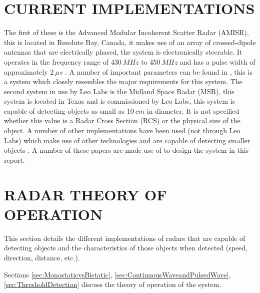\documentclass[11pt]{witseiepaper}
\begin{document}
\begin{bibunit}[witseie]

\section{CURRENT IMPLEMENTATIONS} \label{sec:CurrentImplementations}
 The first of these is the Advanced Modular Incoherent Scatter Radar (AMISR), this is located in Resolute Bay, Canada, it makes use of an array of crossed-dipole antennas that are electrically phased, the system is electronically steerable. It operates in the frequency range of $430~MHz$ to $450~MHz$ and has a pulse width of approximately $2~\mu s$ \cite{AMISR}. A number of important parameters can be found in \cite{AMISR}, this is a system which closely resembles the major requirements for this system.
The second system in use by Leo Labs is the Midland Space Radar (MSR), this system is located in Texas and is commissioned by Leo Labs, this system is capable of detecting objects as small as $10~cm$ in diameter. It is not specified whether this value is a Radar Cross Section  (RCS) or the physical size of the object.
A number of other implementations have been used (not through Leo Labs) which make use of other technologies and are capable of detecting smaller objects \cite{EISCAT, SIMO, telescope, BeamForming, OrbitDetermination, PlanarArray}. A number of these papers are made use of to design the system in this report.


\section{RADAR THEORY OF OPERATION} \label{sec:RadarTheoryOfOperation}
This section details the different implementations of radars that are capable of detecting objects and the characteristics of those objects when detected (speed, direction, distance, etc.).

Sections \ref{sec:MonostaticvsBistatic}, \ref{sec:ContinuousWaveandPulsedWave}, \ref{sec:ThresholdDetection} discuss the theory of operation of the system.


\end{bibunit}
\end{document}
